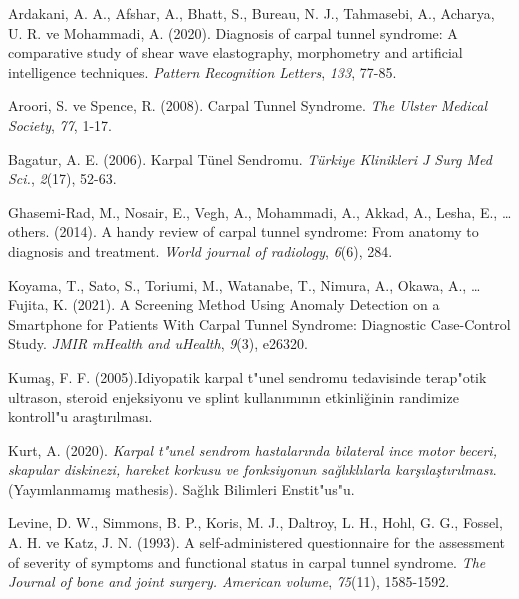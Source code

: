 \documentclass[12pt,twoside]{deuthesis}
\begin{document}
\hypertarget{refs}{}
\begin{CSLReferences}{1}{0}
\leavevmode{}%
Ardakani, A. A., Afshar, A., Bhatt, S., Bureau, N. J., Tahmasebi, A., Acharya, U. R. ve Mohammadi, A. (2020). Diagnosis of carpal tunnel syndrome: A comparative study of shear wave elastography, morphometry and artificial intelligence techniques. \emph{Pattern Recognition Letters}, \emph{133}, 77-85.

\leavevmode{}%
Aroori, S. ve Spence, R. (2008). Carpal Tunnel Syndrome. \emph{The Ulster Medical Society}, \emph{77}, 1-17.

\leavevmode{}%
Bagatur, A. E. (2006). Karpal Tünel Sendromu. \emph{Türkiye Klinikleri J Surg Med Sci.}, \emph{2}(17), 52-63.

\leavevmode{}%
Ghasemi-Rad, M., Nosair, E., Vegh, A., Mohammadi, A., Akkad, A., Lesha, E., \ldots{} others. (2014). A handy review of carpal tunnel syndrome: From anatomy to diagnosis and treatment. \emph{World journal of radiology}, \emph{6}(6), 284.

\leavevmode{}%
Koyama, T., Sato, S., Toriumi, M., Watanabe, T., Nimura, A., Okawa, A., \ldots{} Fujita, K. (2021). A Screening Method Using Anomaly Detection on a Smartphone for Patients With Carpal Tunnel Syndrome: Diagnostic Case-Control Study. \emph{JMIR mHealth and uHealth}, \emph{9}(3), e26320.

\leavevmode{}%
Kumaş, F. F. (2005).{I}diyopatik karpal t{"u}nel sendromu tedavisinde terap{"o}tik ultrason, steroid enjeksiyonu ve splint kullan{ı}m{ı}n{ı}n etkinli{ğ}inin randimize kontroll{"u} ara{ş}t{ı}r{ı}lmas{ı}.

\leavevmode{}%
Kurt, A. (2020). \emph{Karpal t{"u}nel sendrom hastalar{ı}nda bilateral ince motor beceri, skapular diskinezi, hareket korkusu ve fonksiyonun sa{ğ}l{ı}kl{ı}larla kar{ş}{ı}la{ş}t{ı}r{ı}lmas{ı}}. (Yayımlanmamış mathesis). Sa{ğ}l{ı}k Bilimleri Enstit{"u}s{"u}.

\leavevmode{}%
Levine, D. W., Simmons, B. P., Koris, M. J., Daltroy, L. H., Hohl, G. G., Fossel, A. H. ve Katz, J. N. (1993). A self-administered questionnaire for the assessment of severity of symptoms and functional status in carpal tunnel syndrome. \emph{The Journal of bone and joint surgery. American volume}, \emph{75}(11), 1585-1592.


\end{CSLReferences}
\end{document}
